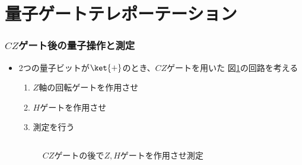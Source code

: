 \section{量子ゲートテレポーテーション}

\begin{frame}
  \frametitle{$CZ$ゲート後の量子操作と測定}

  \pause
  \begin{itemize}
    \item<+-> 2つの量子ビットが$\ket{+}$のとき、$CZ$ゲートを用いた
    図\ref{fig:teleportation_circuit}の回路を考える
    \begin{enumerate}
      \item $Z$軸の回転ゲートを作用させ \label{enum:teleportation_1}
      \item $H$ゲートを作用させ \label{enum:teleportation_2}
      \item 測定を行う \label{enum:teleportation_3}
    \end{enumerate}

    \begin{columns}
      \begin{column}{0.6\textwidth}
        \begin{figure}
          \centering
          \caption{$CZ$ゲートの後で$Z, H$ゲートを作用させ測定}
          \label{fig:teleportation_circuit}
        \end{figure}


\end{column}
\end{columns}
\end{itemize}
\end{frame}
